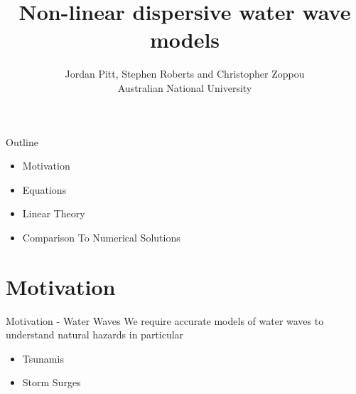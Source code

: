 \documentclass[pdf]{beamer}
\title{Non-linear dispersive water wave models}
\author{Jordan Pitt, Stephen Roberts and Christopher Zoppou \\ Australian National University}
\begin{document}
	
\begin{frame}
\titlepage
\end{frame}
	


\begin{frame}{Outline}
	\begin{itemize}
		\item Motivation
		\item Equations
		\item Linear Theory
		\item Comparison To Numerical Solutions
	\end{itemize}
\end{frame}
\section{Motivation}
\begin{frame}{Motivation - Water Waves}
We require accurate models of water waves to understand natural hazards in particular
	\begin{itemize}
		\item Tsunamis
		\item Storm Surges
	\end{itemize}
\end{frame}
\end{document}
